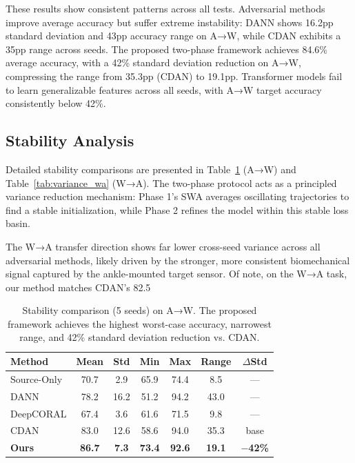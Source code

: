 \documentclass[conference]{IEEEtran}
\begin{document}
These results show consistent patterns across all tests. Adversarial methods improve average accuracy but suffer extreme instability: DANN shows 16.2pp standard deviation and 43pp accuracy range on A→W, while CDAN exhibits a 35pp range across seeds. The proposed two-phase framework achieves 84.6\% average accuracy, with a 42\% standard deviation reduction on A→W, compressing the range from 35.3pp (CDAN) to 19.1pp. Transformer models fail to learn generalizable features across all seeds, with A→W target accuracy consistently below 42\%.

\subsection{Stability Analysis}
\label{sec:variance}
Detailed stability comparisons are presented in Table~\ref{tab:variance_aw} (A→W) and Table~\ref{tab:variance_wa} (W→A). The two-phase protocol acts as a principled variance reduction mechanism: Phase 1’s SWA averages oscillating trajectories to find a stable initialization, while Phase 2 refines the model within this stable loss basin.

The W→A transfer direction shows far lower cross-seed variance across all adversarial methods, likely driven by the stronger, more consistent biomechanical signal captured by the ankle-mounted target sensor. Of note, on the W→A task, our method matches CDAN’s 82.5%

\begin{table}[!t]
\centering
\caption{Stability comparison (5 seeds) on A→W. The proposed framework achieves the highest worst-case accuracy, narrowest range, and 42\% standard deviation reduction vs. CDAN.}
\label{tab:variance_aw}
\setlength{\tabcolsep}{3.5pt}
\footnotesize
\begin{tabular}{l cccccc}
\toprule
Method & Mean & Std & Min & Max & Range & $\Delta$Std \\
\midrule
Source-Only & 70.7 & 2.9 & 65.9 & 74.4 & 8.5 & --- \\
DANN        & 78.2 & 16.2 & 51.2 & 94.2 & 43.0 & --- \\
DeepCORAL   & 67.4 & 3.6 & 61.6 & 71.5 & 9.8 & --- \\
CDAN        & 83.0 & 12.6 & 58.6 & 94.0 & 35.3 & base \\
\textbf{Ours} & \textbf{86.7} & \textbf{7.3} & \textbf{73.4} & \textbf{92.6} & \textbf{19.1} & \textbf{$-$42\%} \\
\bottomrule
\end{tabular}
\end{table}
\end{document}
